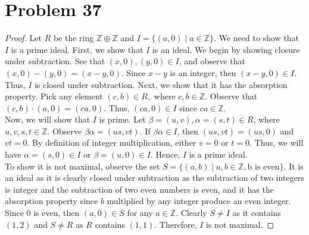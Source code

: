 \documentclass[a4paper,12pt]{article}
\begin{document}
\section*{Problem 37}
\begin{proof}
   Let $R$ be the ring $\mathbb{Z}\oplus \mathbb{Z}$ and $I=\{(a,0) \mid a \in \mathbb{Z}\}.$ We need to show that $I$ is a prime ideal. First, we show that $I$ is an ideal. We begin by showing closure under subtraction. See that $(x,0), (y,0) \in I$, and observe that $(x,0)-(y,0)=(x-y,0).$ Since $x-y$ is an integer, then $(x-y,0) \in I$. Thus, $I$ is closed under subtraction. Next, we show that it has the absorption property. Pick any element $(c,b) \in R,$ where $c,b \in \mathbb{Z}.$ Observe that $(c,b)\cdot (a,0)=(ca,0)$. Thus, $(ca,0) \in I$ since $ca \in \mathbb{Z}.$
\\ Now, we will show that $I$ is prime. Let $\beta=(u,v),\alpha =(s,t) \in R$, where $u,v,s,t \in \mathbb{Z}$. Observe $\beta \alpha = (us, vt)$. If $\beta \alpha \in I$, then $(us,vt)=(us, 0)$ and $vt=0.$ By definition of integer multiplication, either $v=0$ or $t=0$. Thus, we will have $\alpha=(s,0) \in I$ or $\beta = (u,0) \in I.$ Hence, $I$ is a prime ideal. 
\\To show it is not maximal, observe the set $S=\{(a,b) \mid a,b \in \mathbb{Z}, \text{b is even}\}.$ It is an ideal as it is clearly closed under subtraction as the subtraction of two integers is integer and the subtraction of two even numbers is even, and it has the absorption property since $b$ multiplied by any integer produce an even integer. Since $0$ is even, then $(a,0) \in S$ for any $a \in \mathbb{Z}.$ Clearly $S \ne I$ as it contains $(1,2)$ and $S \ne R$ as $R$ contains $(1,1).$ Therefore, $I$ is not maximal.
\end{proof}
\end{document}
